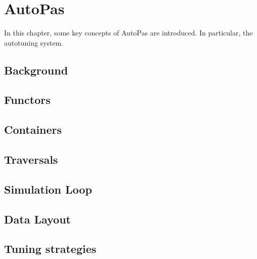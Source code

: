 \chapter[AutoPas]{AutoPas}
\label{cp:autopas}

{
\parindent0pt
In this chapter, some key concepts of AutoPas are introduced. In particular, the autotuning system.
}


\section{Background}
\section{Functors}
\section{Containers}
\section{Traversals}
\section{Simulation Loop}
\section{Data Layout}
\section{Tuning strategies}


